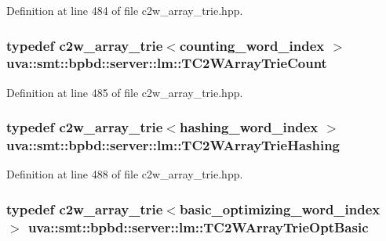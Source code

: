 Definition at line 484 of file c2w\+\_\+array\+\_\+trie.\+hpp.

\hypertarget{namespaceuva_1_1smt_1_1bpbd_1_1server_1_1lm_aecaa405295396773088ff3a8e905a060}{}
\subsubsection[{T\+C2\+W\+Array\+Trie\+Count}]{\setlength{\rightskip}{0pt plus 5cm}typedef {\bf c2w\+\_\+array\+\_\+trie}$<${\bf counting\+\_\+word\+\_\+index} $>$ {\bf uva\+::smt\+::bpbd\+::server\+::lm\+::\+T\+C2\+W\+Array\+Trie\+Count}}\label{namespaceuva_1_1smt_1_1bpbd_1_1server_1_1lm_aecaa405295396773088ff3a8e905a060}


Definition at line 485 of file c2w\+\_\+array\+\_\+trie.\+hpp.

\hypertarget{namespaceuva_1_1smt_1_1bpbd_1_1server_1_1lm_a4ce1cd1267b5073068ef3c26f760c950}{}
\subsubsection[{T\+C2\+W\+Array\+Trie\+Hashing}]{\setlength{\rightskip}{0pt plus 5cm}typedef {\bf c2w\+\_\+array\+\_\+trie}$<${\bf hashing\+\_\+word\+\_\+index} $>$ {\bf uva\+::smt\+::bpbd\+::server\+::lm\+::\+T\+C2\+W\+Array\+Trie\+Hashing}}\label{namespaceuva_1_1smt_1_1bpbd_1_1server_1_1lm_a4ce1cd1267b5073068ef3c26f760c950}


Definition at line 488 of file c2w\+\_\+array\+\_\+trie.\+hpp.

\hypertarget{namespaceuva_1_1smt_1_1bpbd_1_1server_1_1lm_aa97ceb9b76e43af0e1ce7c23eed23432}{}
\subsubsection[{T\+C2\+W\+Array\+Trie\+Opt\+Basic}]{\setlength{\rightskip}{0pt plus 5cm}typedef {\bf c2w\+\_\+array\+\_\+trie}$<${\bf basic\+\_\+optimizing\+\_\+word\+\_\+index} $>$ {\bf uva\+::smt\+::bpbd\+::server\+::lm\+::\+T\+C2\+W\+Array\+Trie\+Opt\+Basic}}\label{namespaceuva_1_1smt_1_1bpbd_1_1server_1_1lm_aa97ceb9b76e43af0e1ce7c23eed23432}


